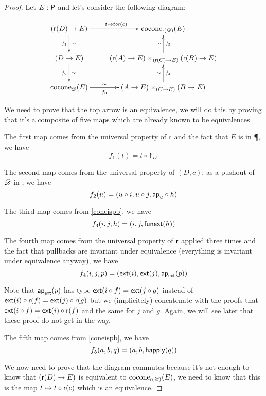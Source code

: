 \begin{proof}
  Let $E:\P$ and let’s consider the following diagram:

  \[\xymatrix{ (\reflect(D)\to E)
    \ar^{t\mapsto{}\composecocone{t}{\reflect(c)}}[r] \ar_{f_1}^\sim[d]
    &
    \cocone{\reflect(\Ddiag)}{E}\\
    (D\to E) \ar_{f_2}^\sim[d] &
    (\reflect(A)\to{}E)\times_{(\reflect(C)\to{}E)}(\reflect(B)\to{}E)
    \ar_{f_5}^\sim[u] \\
    \cocone{\Ddiag}{E}\ar_-{f_3}^-\sim[r] & (A\to{}E)\times_{(C\to{}E)}(B\to{}E)
    \ar_{f_4}^\sim[u] }\]

  We need to prove that the top arrow is an equivalence, we will do this by
  proving that it’s a composite of five maps which are already known to be
  equivalences.

  The first map comes from the universal property of $\reflect$ and the fact
  that $E$ is in \P, we have
  \[f_1(t)=t\circ\project_D\]

  The second map comes from the universal property of $(D,c)$, as a pushout of
  $\Ddiag$ in \type, we have
  \[f_2(u)=(u\circ{}i,u\circ{}j,\mapfunc{u}\circ{}h)\]

  The third map comes from \autoref{coneispb}, we have
  \[f_3(i,j,h)=(i,j,\funext(h))\]

  The fourth map comes from the universal property of $\reflect$ applied three
  times and the fact that pullbacks are invariant under equivalence (everything
  is invariant under equivalence anyway), we have
  \[f_4(i,j,p)=(\ext(i),\ext(j),\mapfunc{\ext}(p))\]

  Note that $\mapfunc{\ext}(p)$ has type $\ext(i\circ{}f)=\ext(j\circ{}g)$
  instead of $\ext(i)\circ\reflect(f)=\ext(j)\circ\reflect(g)$ but we
  (implicitely) concatenate with the proofs that
  $\ext(i\circ{}f)=\ext(i)\circ\reflect(f)$ and the same for $j$ and $g$. Again,
  we will see later that these proof do not get in the way.

  The fifth map comes from \autoref{coneispb}, we have
  \[f_5(a,b,q)=(a,b,\happly(q))\]

  We now need to prove that the diagram commutes because it’s not enough to
  know that $(\reflect(D)\to{}E)$ is equivalent to
  $\cocone{\reflect(\Ddiag)}{E}$, we need to know that this is the map
  $t\mapsto{}t\circ\reflect(c)$ which is an equivalence.


\end{proof}
